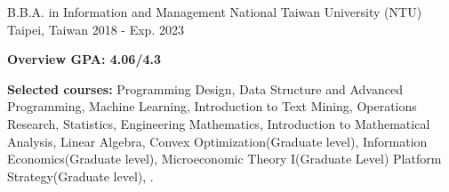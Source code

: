 

\begin{cventries}

  \cventry
    {B.B.A. in Information and Management} %
    {National Taiwan University (NTU)} %
    {Taipei, Taiwan} %
    {2018 - Exp. 2023} %
    {
      \begin{cvitems} %
        \item {\textbf{Overview GPA: 4.06/4.3}}
        \item {\textbf{Selected courses:}  
                Programming Design,
                Data Structure and Advanced Programming,
                Machine Learning,
                Introduction to Text Mining,
                Operations Research,
                Statistics,
                Engineering Mathematics,
                Introduction to Mathematical Analysis,
                Linear Algebra,
                Convex Optimization(Graduate level),
                Information Economics(Graduate level),
                Microeconomic Theory I(Graduate Level)
                Platform Strategy(Graduate level), 
            .}
      \end{cvitems}
    }

\end{cventries}

